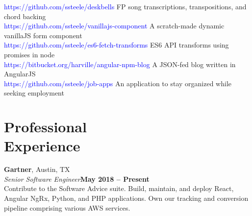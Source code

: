\documentclass[margin,line]{resume}
\begin{document}
\begin{resume}
\textcolor{blue}{https://github.com/ssteele/deskbells} FP song transcriptions, transpositions, and chord backing\vspace{0.3mm}\\
\textcolor{blue}{https://github.com/ssteele/vanillajs-component} A scratch-made dynamic vanillaJS form component\vspace{0.3mm}\\
\textcolor{blue}{https://github.com/ssteele/es6-fetch-transforms} ES6 API transforms using promises in node\vspace{0.3mm}\\
\textcolor{blue}{https://bitbucket.org/harville/angular-npm-blog} A JSON-fed blog written in AngularJS\vspace{0.3mm}\\
\textcolor{blue}{https://github.com/ssteele/job-apps} An application to stay organized while seeking employment\vspace{0.3mm}



\section{\mysidestyle Professional\\Experience}

\textbf{Gartner}, Austin, TX
\vspace{2mm}\\
\textsl{Senior Software Engineer}\hfill \textbf{May 2018 -- Present}\vspace{1mm}\\
Contribute to the Software Advice suite. Build, maintain, and deploy React, Angular NgRx, Python, and PHP applications. Own our tracking and conversion pipeline comprising various AWS services.


\end{resume}
\end{document}
